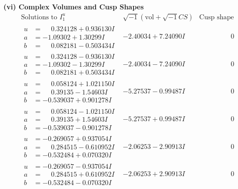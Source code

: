 \documentclass[1p]{elsarticle_modified}
\theoremstyle{definition}
\newcommand{\I}{\sqrt{-1}}
\begin{document}
\newpage\flushleft \textbf{(vi) Complex Volumes and Cusp Shapes}
$$\begin{array}{c|c|c}  
\text{Solutions to }I^u_{1}& \I (\text{vol} + \sqrt{-1}CS) & \text{Cusp shape}\\
 \hline 
\begin{aligned}
u &= \phantom{-}0.324128 + 0.936130 I \\
a &= -1.09302 + 1.30299 I \\
b &= \phantom{-}0.082181 - 0.503434 I\end{aligned}
 & -2.40034 + 7.24090 I & \phantom{-0.000000 } 0 \\ \hline\begin{aligned}
u &= \phantom{-}0.324128 - 0.936130 I \\
a &= -1.09302 - 1.30299 I \\
b &= \phantom{-}0.082181 + 0.503434 I\end{aligned}
 & -2.40034 - 7.24090 I & \phantom{-0.000000 } 0 \\ \hline\begin{aligned}
u &= \phantom{-}0.058124 + 1.021150 I \\
a &= \phantom{-}0.39135 - 1.54603 I \\
b &= -0.539037 + 0.901278 I\end{aligned}
 & -5.27537 - 0.99487 I & \phantom{-0.000000 } 0 \\ \hline\begin{aligned}
u &= \phantom{-}0.058124 - 1.021150 I \\
a &= \phantom{-}0.39135 + 1.54603 I \\
b &= -0.539037 - 0.901278 I\end{aligned}
 & -5.27537 + 0.99487 I & \phantom{-0.000000 } 0 \\ \hline\begin{aligned}
u &= -0.269057 + 0.937054 I \\
a &= \phantom{-}0.284515 - 0.610952 I \\
b &= -0.532484 + 0.070320 I\end{aligned}
 & -2.06253 - 2.90913 I & \phantom{-0.000000 } 0 \\ \hline\begin{aligned}
u &= -0.269057 - 0.937054 I \\
a &= \phantom{-}0.284515 + 0.610952 I \\
b &= -0.532484 - 0.070320 I\end{aligned}
 & -2.06253 + 2.90913 I & \phantom{-0.000000 } 0 \\ \hline\begin{aligned}

\end{aligned}
\end{array}$$
\end{document}

